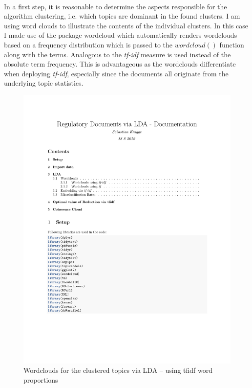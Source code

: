 \documentclass[11pt,a4paper]{article}
\begin{document}
\ \\
In a first step, it is reasonable to determine the aspects responsible for the algorithm clustering, i.e. which topics are dominant in the found clusters. I am using word clouds to illustrate the contents of the individual clusters. In this case I made use of the package wordcloud which automatically renders wordclouds based on a frequency distribution which is passed to the $wordcloud()$ function along with the terms. Analogous to \cite{Winter2017} the \textit{tf-idf} measure is used instead of the absolute term frequency. This is advantageous as the wordclouds differentiate when deploying \textit{tf-idf}, especially since the documents all originate from the underlying topic statistics.\\
\begin{figure}[h]
	\centering
	\includegraphics[page=10, trim=68 440 10 50,clip,width=1.2\textwidth]{Docs_LDA_adapted.pdf}
	\caption{Wordclouds for the clustered topics via LDA – using tfidf word proportions}
	\label{Wordclouds_tfidf}
\end{figure}
\end{document}
